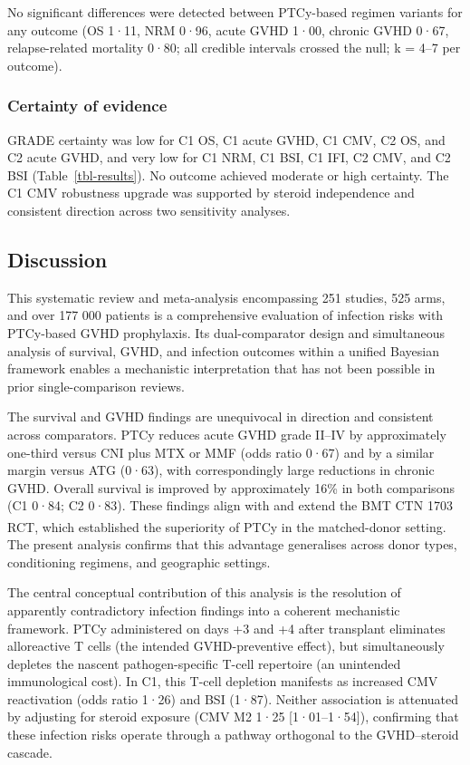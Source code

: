 \documentclass[
  british,
  8.6pt,
  a4paper,
  twocolumn]{article}
\begin{document}
No significant differences were detected between PTCy-based regimen
variants for any outcome (OS 1·11, NRM 0·96, acute GVHD 1·00, chronic
GVHD 0·67, relapse-related mortality 0·80; all credible intervals
crossed the null; k = 4--7 per outcome).

\subsubsection{Certainty of evidence}\label{certainty-of-evidence}

GRADE certainty was low for C1 OS, C1 acute GVHD, C1 CMV, C2 OS, and C2
acute GVHD, and very low for C1 NRM, C1 BSI, C1 IFI, C2 CMV, and C2 BSI
(Table~\ref{tbl-results}). No outcome achieved moderate or high
certainty. The C1 CMV robustness upgrade was supported by steroid
independence and consistent direction across two sensitivity analyses.

\subsection{Discussion}\label{discussion}

This systematic review and meta-analysis encompassing 251 studies, 525
arms, and over 177 000 patients is a comprehensive evaluation of
infection risks with PTCy-based GVHD prophylaxis. Its dual-comparator
design and simultaneous analysis of survival, GVHD, and infection
outcomes within a unified Bayesian framework enables a mechanistic
interpretation that has not been possible in prior single-comparison
reviews.

The survival and GVHD findings are unequivocal in direction and
consistent across comparators. PTCy reduces acute GVHD grade II--IV by
approximately one-third versus CNI plus MTX or MMF (odds ratio 0·67) and
by a similar margin versus ATG (0·63), with correspondingly large
reductions in chronic GVHD. Overall survival is improved by
approximately 16\% in both comparisons (C1 0·84; C2 0·83). These
findings align with and extend the BMT CTN 1703 RCT, which established
the superiority of PTCy in the matched-donor
setting.\textsuperscript{} The
present analysis confirms that this advantage generalises across donor
types, conditioning regimens, and geographic settings.

The central conceptual contribution of this analysis is the resolution
of apparently contradictory infection findings into a coherent
mechanistic framework. PTCy administered on days +3 and +4 after
transplant eliminates alloreactive T cells (the intended GVHD-preventive
effect), but simultaneously depletes the nascent pathogen-specific
T-cell repertoire (an unintended immunological cost). In C1, this T-cell
depletion manifests as increased CMV reactivation (odds ratio 1·26) and
BSI (1·87). Neither association is attenuated by adjusting for steroid
exposure (CMV M2 1·25 {[}1·01--1·54{]}), confirming that these infection
risks operate through a pathway orthogonal to the GVHD--steroid cascade.
\end{document}
